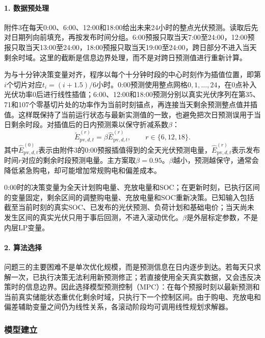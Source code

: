 \documentclass{cumcmthesis}
\begin{document}
\paragraph{1. 数据预处理}

附件3在每天0:00、6:00、12:00和18:00给出未来24小时的整点光伏预测。读取后先对日期列向前填充，再按发布时间分组。6:00预报只取当天7:00至24:00，12:00预报只取当天13:00至24:00，18:00预报只取当天19:00至24:00，跨日部分不进入当天剩余时域。这里的截断是信息边界处理，而不是对跨日预测值进行重新计算。

为与十分钟决策变量对齐，程序以每个十分钟时段的中心时刻作为插值位置，即第$i$个切片对应$t_i=(i+1.5)/6$小时。0:00预测使用整点网格$0,1,\ldots,24$，在0点补入光伏功率0后进行线性插值；6:00、12:00和18:00预测分别以真实光伏序列在第35、71和107个零基切片处的功率作为当前时刻锚点，再连接当天剩余预测整点值并插值。这样既保持了当前运行状态与最新实测值的一致，也避免把次日预测误用于当日剩余时段。对插值后的日内预测乘以保守折减系数$\beta$：
\begin{equation}
\widetilde E_{\mathrm{pv},d,t}^{(r)}=\beta\widehat E_{\mathrm{pv},d,t}^{(r)},\qquad r\in\{6,12,18\}.
\tag{16}
\end{equation}
其中$\widehat E^{(0)}_{\mathrm{pv},d,t}$表示由附件3的0:00预报插值得到的全天光伏预测电量，$\widehat E^{(r)}_{\mathrm{pv},d,t}$表示发布时间$r$对应的剩余时段预测电量。主方案取$\beta=0.95$。$\beta$越小，预测越保守，通常会降低紧急购电，却可能增加常规购电和偏差成本。

0:00时的决策变量为全天计划购电量、充放电量和SOC；在更新时刻，已执行区间的变量固定，剩余区间的调整购电量、充放电量和SOC重新决策。已知输入包括截至当前时刻的真实SOC、已发布的光伏预测、负荷计划和基础电价；当天尚未发生区间的真实光伏只用于事后回测，不进入滚动优化。$\beta$是外层标定参数，不是内层LP变量。

\paragraph{2. 算法选择}

问题三的主要困难不是单次优化规模，而是预测信息在日内逐步到达。若每天只求解一次，已执行决策无法利用新预测修正；若直接使用全天真实数据，又会违反决策时的信息边界。因此选择模型预测控制（MPC）：在每个预报时刻以最新预测和当前真实储能状态重优化剩余时域，只执行下一个控制区间。由于购电、充放电和偏差辅助变量之间仍为线性关系，各滚动阶段均可调用线性规划求解器。

\subsubsection{模型建立}
\end{document}
